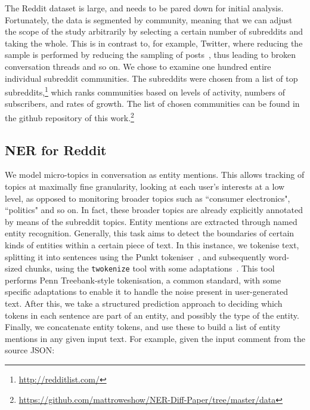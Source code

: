 \documentclass[10pt,journal,compsoc]{IEEEtran}
\begin{document}
The Reddit dataset is large, and needs to be pared down for initial analysis.
Fortunately, the data is segmented by community, meaning that we can adjust the scope of the study arbitrarily by selecting a certain number of subreddits and taking the whole.
This is in contrast to, for example, Twitter, where reducing the sample is performed by reducing the sampling of posts~\cite{kergl2014endogenesis}, thus leading to broken conversation threads and so on.
We chose to examine one hundred entire individual subreddit communities.
The subreddits were chosen from a list of top subreddits,\footnote{\url{http://redditlist.com/}} which ranks communities based on levels of activity, numbers of subscribers, and rates of growth.
The list of chosen communities can be found in the github repository of this work.\footnote{\url{https://github.com/mattroweshow/NER-Diff-Paper/tree/master/data}}


\subsection{NER for Reddit}


We model micro-topics in conversation as entity mentions.
This allows tracking of topics at maximally fine granularity, looking at each user's interests at a low level, as opposed to monitoring broader topics such as ``consumer electronics", ``politics" and so on.
In fact, these broader topics are already explicitly annotated by means of the subreddit topics.
Entity mentions are extracted through named entity recognition.
Generally, this task aims to detect the boundaries of certain kinds of entities within a certain piece of text.
In this instance, we tokenise text, splitting it into sentences using the Punkt tokeniser~\cite{kiss2006unsupervised}, and subsequently word-sized chunks, using the {\tt twokenize} tool with some adaptations~\cite{o2010tweetmotif}.
This tool performs Penn Treebank-style tokenisation, a common standard, with some specific adaptations to enable it to handle the noise present in user-generated text.
After this, we take a structured prediction approach to deciding which tokens in each sentence are part of an entity, and possibly the type of the entity.
Finally, we concatenate entity tokens, and use these to build a list of entity mentions in any given input text.
For example, given the input comment from the source JSON:
\end{document}
